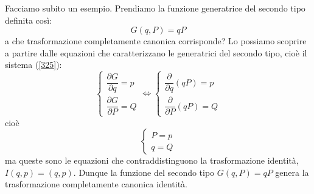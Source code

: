\documentclass[a4paper,openany]{article}
\begin{document}
	Facciamo subito un esempio. Prendiamo la funzione generatrice del secondo tipo definita così:
	$$
	G(q,P) = qP
	$$
	a che trasformazione completamente canonica corrisponde? Lo possiamo scoprire a partire dalle equazioni che caratterizzano le generatrici del secondo tipo, cioè il sistema (\ref{325}):
	\begin{equation}\label{key}
		\begin{cases}
			\dfrac{\partial G}{\partial q} = p \\[6pt]
			\dfrac{\partial G}{\partial P} = Q
		\end{cases}
		\iff 
		\begin{cases}
			\dfrac{\partial }{\partial q}(qP) = p \\[6pt]
			\dfrac{\partial }{\partial P}(qP) = Q
		\end{cases}
	\end{equation}
	cioè
	\begin{equation}\label{key}
		\begin{cases}
			P = p \\[6pt]
			q = Q
		\end{cases}
	\end{equation}
	ma queste sono le equazioni che contraddistinguono la trasformazione identità, $I(q,p) = (q,p)$. Dunque la funzione del secondo tipo $G(q,P) = qP$ genera la trasformazione completamente canonica identità.
\end{document}
